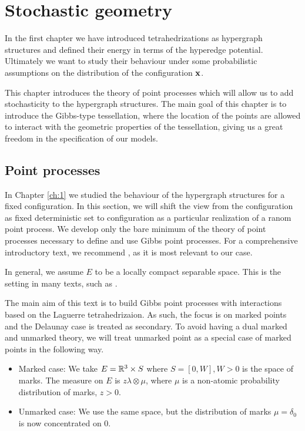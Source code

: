 \chapter{Stochastic geometry}\label{ch:2}
In the first chapter we have introduced tetrahedrizations as hypergraph structures and defined their energy in terms of the hyperedge potential. Ultimately we want to study their behaviour under some probabilistic assumptions on the distribution of the configuration ${\mathbf{x}}$. 

This chapter introduces the theory of point processes which will allow us to add stochasticity to the hypergraph structures. The main goal of this chapter is to introduce the Gibbs-type tessellation, where the location of the points are allowed to interact with the geometric properties of the tessellation, giving us a great freedom in the specification of our models.

\section{Point processes}
In Chapter \ref{ch:1} we studied the behaviour of the hypergraph structures for a fixed configuration. In this section, we will shift the view from the configuration as fixed deterministic set to configuration as a particular realization of a ranom point process.
We develop only the bare minimum of the theory of point processes necessary to define and use Gibbs point processes. For a comprehensive introductory text, we recommend \cite{MollerWaagepetersen2003}, as it is most relevant to our case. \newline

\noindent In general, we assume $E$ to be a locally compact separable space. This is the setting in many texts, such as \cite{SchneiderWeil2008}.

The main aim of this text is to build Gibbs point processes with interactions based on the Laguerre tetrahedrizaion. As such, the focus is on marked points and the Delaunay case is treated as secondary. To avoid having a dual marked and unmarked theory, we will treat unmarked point as a special case of marked points in the following way. 

\begin{itemize}
	\item Marked case: We take $E={\mathbb R^3}\times S$ where $S=[0,W],W>0$ is the space of marks. The measure on $E$ is $z\lambda \otimes \mu$, where $\mu$ is a non-atomic probability distribution of marks, $z>0$. 
	\item Unmarked case: We use the same space, but the distribution of marks $\mu=\delta_0$ is now concentrated on $0$.
\end{itemize}


